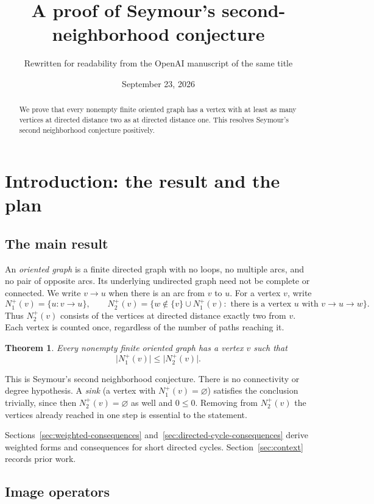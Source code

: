 \documentclass[11pt]{article}
\title{A proof of Seymour's second-neighborhood conjecture}
\author{Rewritten for readability from the OpenAI manuscript of the same title}
\date{September 23, 2026}
\newtheorem{theorem}{Theorem}[section]
\theoremstyle{remark}
\newcommand{\abs}[1]{\lvert #1\rvert}
\begin{document}
\maketitle
\begin{abstract}
We prove that every nonempty finite oriented graph has a vertex with at least
as many vertices at directed distance two as at directed distance one.
This resolves Seymour's second neighborhood conjecture positively.
\end{abstract}

\section{Introduction: the result and the plan}\label{sec:introduction}

\subsection{The main result}

An \emph{oriented graph} is a finite directed graph with no loops, no multiple
arcs, and no pair of opposite arcs. Its underlying undirected graph need
not be complete or connected. We write $v\to u$ when there is an arc from $v$ to $u$.
For a vertex \(v\), write
\[
 N_1^+(v)=\{u:v\to u\},\qquad
 N_2^+(v)=\{w\notin\{v\}\cup N_1^+(v):
                 \text{ there is a vertex }u\text{ with }v\to u\to w\}.
\]
Thus \(N_2^+(v)\) consists of the vertices at directed distance exactly two
from \(v\). Each vertex is counted once, regardless of the number of paths
reaching it.

\begin{theorem}\label{thm:main}
Every nonempty finite oriented graph has a vertex \(v\) such that
\[
 \abs{N_1^+(v)}\leq \abs{N_2^+(v)}.
\]
\end{theorem}

This is Seymour's second neighborhood conjecture. There is no
connectivity or degree hypothesis. A \emph{sink} (a vertex with
$N_1^+(v)=\varnothing$) satisfies the conclusion trivially, since then
$N_2^+(v)=\varnothing$ as well and $0\le 0$. Removing from $N_2^+(v)$ the
vertices already reached in one step is essential to the statement.

Sections~\ref{sec:weighted-consequences}
and~\ref{sec:directed-cycle-consequences} derive weighted forms and
consequences for short directed cycles. Section~\ref{sec:context} records
prior work.

\subsection{Image operators}
\end{document}
